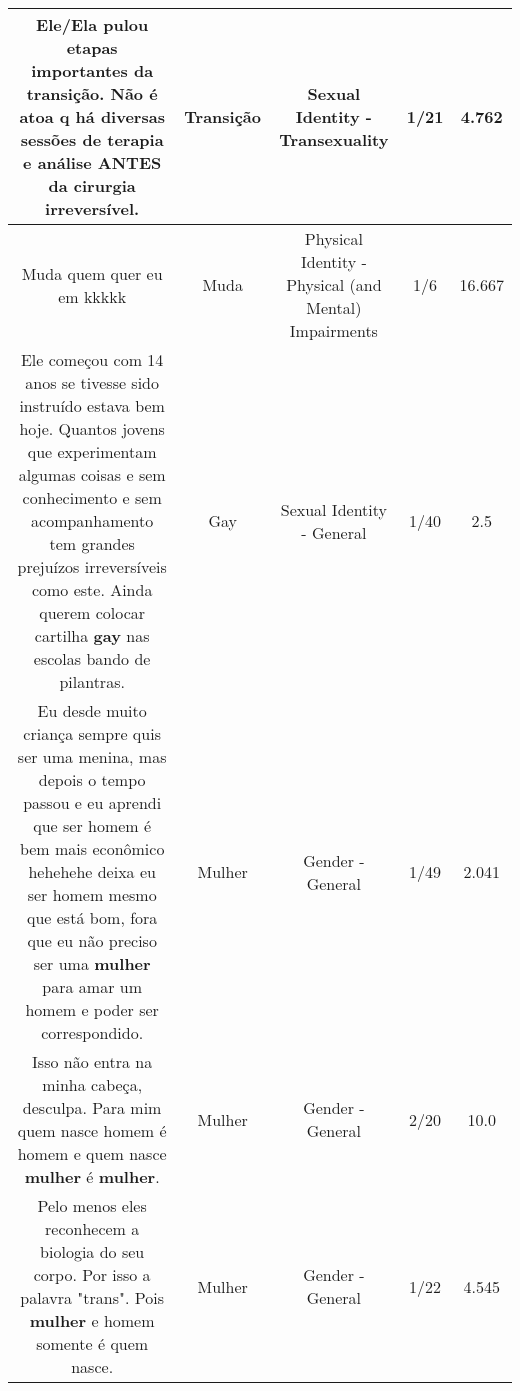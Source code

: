 \documentclass[11pt]{article}
\newlength\mylength
\begin{document}
\begin{center}
\begin{longtable}{|C{.65\mylength}|C{.30\mylength}|C{.12\mylength}|C{.12\mylength}|C{.12\mylength}|}
  \small Ele/Ela pulou etapas importantes da \textbf{transição}. Não é atoa q há diversas sessões de terapia e análise ANTES da cirurgia irreversível.\normalsize   & Transição & Sexual Identity - Transexuality & 1/21 & 4.762 \\  \hline
  \small Muda quem quer eu em kkkkk\normalsize   & Muda & Physical Identity - Physical (and Mental) Impairments & 1/6 & 16.667 \\  \hline
  \small Ele começou com 14 anos se tivesse sido instruído estava bem hoje. Quantos jovens que experimentam algumas coisas e sem conhecimento e sem  acompanhamento tem grandes prejuízos irreversíveis como este. Ainda querem colocar cartilha \textbf{gay} nas escolas bando de pilantras.\normalsize   & Gay & Sexual Identity - General & 1/40 & 2.5 \\  \hline
  \small Eu desde muito criança sempre quis ser uma menina, mas depois o tempo passou e eu aprendi que ser homem é bem mais econômico hehehehe deixa eu ser homem mesmo que está bom, fora que eu não preciso ser uma \textbf{mulher} para amar um homem e poder ser correspondido.\normalsize   & Mulher & Gender - General & 1/49 & 2.041 \\  \hline
  \small Isso não entra na minha cabeça, desculpa. Para mim quem nasce homem é homem e quem nasce \textbf{mulher} é \textbf{mulher}.\normalsize   & Mulher & Gender - General & 2/20 & 10.0 \\  \hline
  \small Pelo menos eles reconhecem a biologia do seu corpo. Por isso a palavra "trans". Pois \textbf{mulher} e homem somente é quem nasce.\normalsize   & Mulher & Gender - General & 1/22 & 4.545 \\  \hline

\end{longtable}
\end{center}
\end{document}
